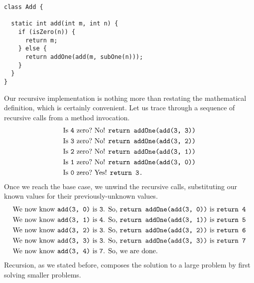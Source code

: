 \begin{lstlisting}[language=MyJava]
class Add {

  static int add(int m, int n) {
    if (isZero(n)) { 
      return m;
    } else {
      return addOne(add(m, subOne(n)));
    }
  }
}
\end{lstlisting}
Our recursive implementation is nothing more than restating the mathematical definition, which is certainly convenient. Let us trace through a sequence of recursive calls from a method invocation.
\begin{align*}
    \text{Is }\texttt{4} \text{ zero?} &\text{ No! }\texttt{return addOne(add(3, 3))}\\
    \text{Is }\texttt{3} \text{ zero?} &\text{ No! }\texttt{return addOne(add(3, 2))}\\
    \text{Is }\texttt{2} \text{ zero?} &\text{ No! }\texttt{return addOne(add(3, 1))}\\
    \text{Is }\texttt{1} \text{ zero?} &\text{ No! }\texttt{return addOne(add(3, 0))}\\
    \text{Is }\texttt{0} \text{ zero?} &\text{ Yes! }\texttt{return 3.}
\end{align*}
Once we reach the base case, we unwind the recursive calls, substituting our known values for their previously-unknown values.
\begin{align*}
    \text{We now know }\texttt{add(3, 0)} \text{ is }\texttt{3}\text{. So, } &\texttt{return addOne(add(3, 0))} \text{ is } \texttt{return 4}\\
    \text{We now know }\texttt{add(3, 1)} \text{ is }\texttt{4}\text{. So, } &\texttt{return addOne(add(3, 1))} \text{ is } \texttt{return 5}\\
    \text{We now know }\texttt{add(3, 2)} \text{ is }\texttt{3}\text{. So, } &\texttt{return addOne(add(3, 2))} \text{ is } \texttt{return 6}\\
    \text{We now know }\texttt{add(3, 3)} \text{ is }\texttt{3}\text{. So, } &\texttt{return addOne(add(3, 3))} \text{ is } \texttt{return 7}\\
    \text{We now know }\texttt{add(3, 4)} \text{ is }\texttt{7}\text{. So, } &\text{we are done.} 
\end{align*}
Recursion, as we stated before, composes the solution to a large problem by first solving smaller problems.

